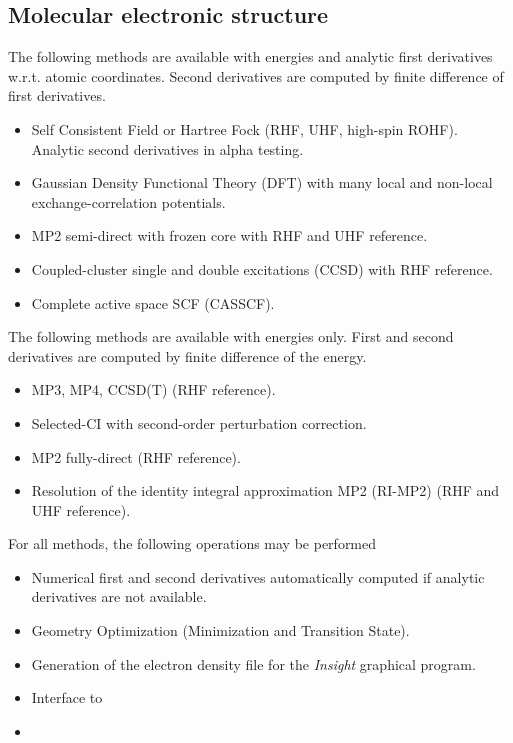 \label{sec:functionality}

\subsection{Molecular electronic structure}

The following methods are available with energies and analytic first
derivatives w.r.t. atomic coordinates.  Second derivatives are
computed by finite difference of first derivatives.
\begin{itemize}
\item Self Consistent Field or Hartree Fock (RHF, UHF, high-spin
  ROHF).  Analytic second derivatives in alpha testing.  
\item Gaussian Density Functional Theory (DFT) with many local and
  non-local exchange-correlation potentials.
\item MP2 semi-direct with frozen core with RHF and UHF reference.
\item Coupled-cluster single and double excitations (CCSD) with RHF
  reference.
\item Complete active space SCF (CASSCF).
\end{itemize}

The following methods are available with energies only.  First and
second derivatives are computed by finite difference of the energy.
\begin{itemize}
\item MP3, MP4, CCSD(T) (RHF reference).
\item Selected-CI with second-order perturbation correction.
\item MP2 fully-direct (RHF reference).
\item Resolution of the identity integral approximation MP2 (RI-MP2)
  (RHF and UHF reference).
\end{itemize}

For all methods, the following operations may be performed
\begin{itemize}
\item Numerical first and second derivatives automatically computed if
  analytic derivatives are not available.
\item Geometry Optimization (Minimization and Transition State).
\item Generation of the electron density file for the {\em Insight}
      graphical program.
\item Interface to 
\item 
\end{itemize}

